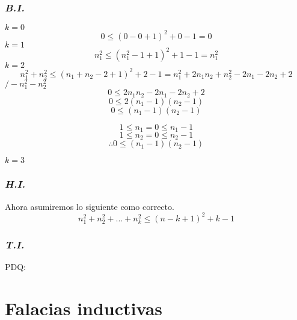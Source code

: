 \documentclass{article}
\begin{document}
\subsubsection*{\emph{B.I.}}
$k=0$
\[0 \leq (0 - 0 +1)^2 + 0 -1 = 0\]
$k=1$
\[ n_1^2 \leq (n_1^2 - 1 + 1)^2 + 1 - 1 = n_1^2\]
$k=2$
\[ n_1^2 + n_2^2 \leq (n_1 + n_2 - 2 + 1)^2 + 2 -1 = n_1^2 + 2n_1n_2+n_2^2-2n_1-2n_2+2 \]
\hspace*{0pt}\hfill $/ - n_1^2 - n_2^2$
\[ 0 \leq  2n_1n_2-2n_1-2n_2+2 \]
\[ 0 \leq 2(n_1 - 1)(n_2 - 1) \]
\[ 0 \leq (n_1 - 1)(n_2 -1) \]

\[ 1 \leq n_1 = 0 \leq n_1 - 1  \]
\[ 1 \leq n_2 = 0 \leq n_2 -1  \]
\[ \therefore  0 \leq (n_1 - 1)(n_2 -1)\]

$k=3$
\subsubsection*{\emph{H.I.}}
Ahora asumiremos lo siguiente como correcto.
\[ n_1^2 + n_2^2 + ... + n_k^2 \leq (n-k+1)^2 + k -1\]


\subsubsection*{\emph{T.I.}}
PDQ:

\section{Falacias inductivas}
\end{document}
